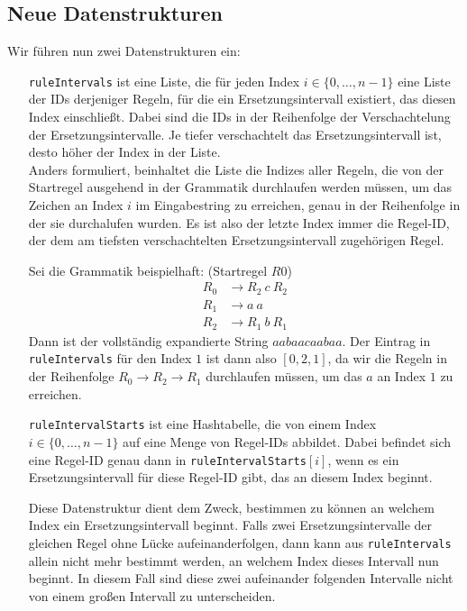 \subsection{Neue Datenstrukturen}
Wir führen nun zwei Datenstrukturen ein: 
\begin{itemize}[leftmargin=10em]
	\item[\texttt{ruleIntervals}] ist eine Liste, die für jeden Index $i \in \{0, \dots, n - 1\}$ eine Liste der IDs derjeniger Regeln, für die ein Ersetzungsintervall existiert, das diesen Index einschließt. Dabei sind die IDs in der Reihenfolge der Verschachtelung der Ersetzungsintervalle. Je tiefer verschachtelt das Ersetzungsintervall ist, desto höher der Index in der Liste.\\ 
	Anders formuliert, beinhaltet die Liste die Indizes aller Regeln, die von der Startregel ausgehend in der Grammatik durchlaufen werden müssen, um das Zeichen an Index $i$ im Eingabestring zu erreichen, genau in der Reihenfolge in der sie durchalufen wurden. Es ist also der letzte Index immer die Regel-ID, der dem am tiefsten verschachtelten Ersetzungsintervall zugehörigen Regel. 
	
	Sei die Grammatik beispielhaft: (Startregel $R0$)
	\begin{align*}
		R_0 &\rightarrow R_2\ c\ R_2\\
		R_1 &\rightarrow a\ a\\
		R_2 &\rightarrow R_1\ b\ R_1
	\end{align*}
	Dann ist der vollständig expandierte String $aabaacaabaa$. Der Eintrag in \texttt{ruleIntervals} für den Index $1$ ist dann also $[0, 2, 1]$, da wir die Regeln in der Reihenfolge $R_0 \rightarrow R_2 \rightarrow R_1$ durchlaufen müssen, um das $a$ an Index $1$ zu erreichen.
	
	\item[\texttt{ruleIntervalStarts}] ist eine Hashtabelle, die von einem Index $i \in \{0, \dots, n - 1\}$ auf eine Menge von Regel-IDs abbildet. Dabei befindet sich eine Regel-ID genau dann in \texttt{ruleIntervalStarts}$[i]$, wenn es ein Ersetzungsintervall für diese Regel-ID gibt, das an diesem Index beginnt.
	
	Diese Datenstruktur dient dem Zweck, bestimmen zu können an welchem Index ein Ersetzungsintervall beginnt. Falls zwei Ersetzungsintervalle der gleichen Regel ohne Lücke aufeinanderfolgen, dann kann aus \texttt{ruleIntervals} allein nicht mehr bestimmt werden, an welchem Index dieses Intervall nun beginnt. In diesem Fall sind diese zwei aufeinander folgenden Intervalle nicht von einem großen Intervall zu unterscheiden.
\end{itemize}

